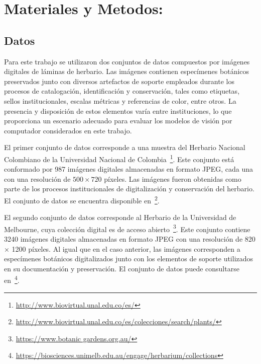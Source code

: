 

\chapter{Materiales y Metodos:}




\section{Datos}

Para este trabajo se utilizaron dos conjuntos de datos compuestos por imágenes digitales de láminas de herbario. Las imágenes contienen especímenes botánicos preservados junto con diversos artefactos de soporte empleados durante los procesos de catalogación, identificación y conservación, tales como etiquetas, sellos institucionales, escalas métricas y referencias de color, entre otros. La presencia y disposición de estos elementos varía entre instituciones, lo que proporciona un escenario adecuado para evaluar los modelos de visión por computador considerados en este trabajo.

El primer conjunto de datos corresponde a una muestra del Herbario Nacional Colombiano de la Universidad Nacional de Colombia~\footnote{\url{http://www.biovirtual.unal.edu.co/es/}}. Este conjunto está conformado por 987 imágenes digitales almacenadas en formato JPEG, cada una con una resolución de $500 \times 720$ píxeles. Las imágenes fueron obtenidas como parte de los procesos institucionales de digitalización y conservación del herbario. El conjunto de datos se encuentra disponible en~\footnote{\url{http://www.biovirtual.unal.edu.co/es/colecciones/search/plants/}}.

El segundo conjunto de datos corresponde al Herbario de la Universidad de Melbourne, cuya colección digital es de acceso abierto~\footnote{\url{https://www.botanic gardens.org.au/}}. Este conjunto contiene 3240 imágenes digitales almacenadas en formato JPEG con una resolución de 820 × 1200 píxeles. Al igual que en el caso anterior, las imágenes corresponden a especímenes botánicos digitalizados junto con los elementos de soporte utilizados en su documentación y preservación. El conjunto de datos puede consultarse en~\footnote{\url{https://biosciences.unimelb.edu.au/engage/herbarium/collections}}.

